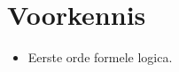 \documentclass[10pt,a4paper,oneside]{report}
\theoremstyle{plain}
\theoremstyle{definition}
\begin{document}



\tableofcontents
\pagebreak


%
%


\section*{Voorkennis}
\begin{itemize}
\item Eerste orde formele logica.
\end{itemize}




\end{document}
